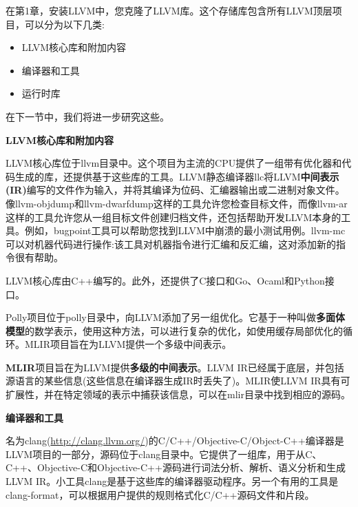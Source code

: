 在第1章，安装LLVM中，您克隆了LLVM库。这个存储库包含所有LLVM顶层项目，可以分为以下几类:\par

\begin{itemize}
	\item LLVM核心库和附加内容
	\item 编译器和工具
	\item 运行时库
\end{itemize}

在下一节中，我们将进一步研究这些。\par

\hspace*{\fill} \par %
\textbf{LLVM核心库和附加内容}

LLVM核心库位于llvm目录中。这个项目为主流的CPU提供了一组带有优化器和代码生成的库，还提供基于这些库的工具。LLVM静态编译器llc将LLVM\textbf{中间表示(IR)}编写的文件作为输入，并将其编译为位码、汇编器输出或二进制对象文件。像llvm-objdump和llvm-dwarfdump这样的工具允许您检查目标文件，而像llvm-ar这样的工具允许您从一组目标文件创建归档文件，还包括帮助开发LLVM本身的工具。例如，bugpoint工具可以帮助您找到LLVM中崩溃的最小测试用例。llvm-mc可以对机器代码进行操作:该工具对机器指令进行汇编和反汇编，这对添加新的指令很有帮助。\par

LLVM核心库由C++编写的。此外，还提供了C接口和Go、Ocaml和Python接口。\par

Polly项目位于polly目录中，向LLVM添加了另一组优化。它基于一种叫做\textbf{多面体模型}的数学表示，使用这种方法，可以进行复杂的优化，如使用缓存局部优化的循环。MLIR项目旨在为LLVM提供一个多级中间表示。\par

\textbf{MLIR}项目旨在为LLVM提供\textbf{多级的中间表示}。LLVM IR已经属于底层，并包括源语言的某些信息(这些信息在编译器生成IR时丢失了)。MLIR使LLVM IR具有可扩展性，并在特定领域的表示中捕获该信息，可以在mlir目录中找到相应的源码。\par

\hspace*{\fill} \par %
\textbf{编译器和工具}

名为clang(\url{http://clang.llvm.org/})的C/C++/Objective-C/Object-C++编译器是LLVM项目的一部分，源码位于clang目录中。它提供了一组库，用于从C、C++、Objective-C和Objective-C++源码进行词法分析、解析、语义分析和生成LLVM IR。小工具clang是基于这些库的编译器驱动程序。另一个有用的工具是clang-format，可以根据用户提供的规则格式化C/C++源码文件和片段。\par

